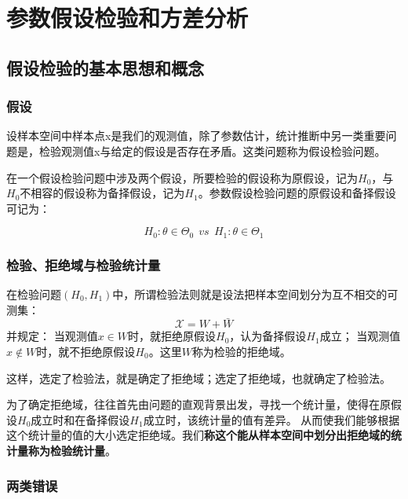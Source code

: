\documentclass[
]{book}
\begin{document}
\chapter{参数假设检验和方差分析}\label{ux53c2ux6570ux5047ux8bbeux68c0ux9a8cux548cux65b9ux5deeux5206ux6790}

\section{假设检验的基本思想和概念}\label{ux5047ux8bbeux68c0ux9a8cux7684ux57faux672cux601dux60f3ux548cux6982ux5ff5}

\subsection{假设}\label{ux5047ux8bbe}

设样本空间中样本点x是我们的观测值，除了参数估计，统计推断中另一类重要问题是，检验观测值x与给定的假设是否存在矛盾。这类问题称为假设检验问题。

在一个假设检验问题中涉及两个假设，所要检验的假设称为原假设，记为\(H_0\)，与\(H_0\)不相容的假设称为备择假设，记为\(H_1\)。参数假设检验问题的原假设和备择假设可记为：

\[
H_0:\theta\in\Theta_0\ \ vs\ \ H_1:\theta\in\Theta_1
\]

\subsection{检验、拒绝域与检验统计量}\label{ux68c0ux9a8cux62d2ux7eddux57dfux4e0eux68c0ux9a8cux7edfux8ba1ux91cf}

在检验问题\((H_0,H_1)\)中，所谓检验法则就是设法把样本空间划分为互不相交的可测集：
\[
\mathcal{X}=W+\bar{W}
\] 并规定：
当观测值\(x\in W\)时，就拒绝原假设\(H_0\)，认为备择假设\(H_1\)成立；
当观测值\(x\notin W\)时，就不拒绝原假设\(H_0\)。这里\(W\)称为检验的拒绝域。

这样，选定了检验法，就是确定了拒绝域；选定了拒绝域，也就确定了检验法。

为了确定拒绝域，往往首先由问题的直观背景出发，寻找一个统计量，使得在原假设\(H_0\)成立时和在备择假设\(H_1\)成立时，该统计量的值有差异。
从而使我们能够根据这个统计量的值的大小选定拒绝域。我们\textbf{称这个能从样本空间中划分出拒绝域的统计量称为检验统计量}。

\subsection{两类错误}\label{ux4e24ux7c7bux9519ux8bef}
\end{document}
